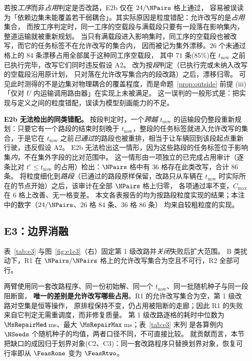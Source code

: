 \begin{remark}[实现缺陷被误读为边集缺陷的一例]
\label{rem:e2b_history}
若按\emph{工序}而非\emph{占用}判定是否改路，E2b 仅在 \(24/\NPairs\) 格上通过，
容易被误读为「依赖边集未能覆盖若干弱耦合」。其实际原因是粒度错配：允许改写的是\emph{占用}集合，
而按工序判定时，同一工序的空载段与满载段只要有一段落在影响集内，整道运输就被重新规划。
当只有满载段进入影响集时，同工序的空载段也被改写，而它的任务标签不在允许改写的集合内，
因而被记为集外漂移。\(26\) 个未通过格上的 \(84\) 条漂移占用全部属于这种同工序空载段，
其中 \(71\) 条(\(85\%\))在 \(t_{\mathrm{now}}\) 之前已执行完毕，改写它们同时违反假设 A2。
改为按\emph{段}判定（已执行完或未纳入改写的空载段沿用原计划，
只对落在允许改写集合内的段改路）之后，漂移归零。
可见此时测得的不是边集对物理耦合的覆盖程度，而是命题~\ref{prop:outside} 前提 (iii)
「仅对 \(U\) 内运输调用路由器」在实现上未被满足。
这一误判的一般形式是：把实现与定义之间的粒度错配，误读为模型刻画能力的不足。

\textbf{E2b 无法检出的同类错配。} 按段判定时，一个\emph{跨越}
\(t_{\mathrm{now}}\) 的运输段仍整段重新规划：只要它有一个路段的结束时刻晚于
\(t_{\mathrm{now}}\)，整段的任务标签就进入允许改写的集合，于是它在 \(t_{\mathrm{now}}\)
之前\emph{已通过}的路段也被重排，相当于让车辆回到该段起点重新行驶，违反假设 A2。
E2b 无法检出这一情形，因为这些路段的任务标签位于影响集\emph{内}，不在集外字段的比对范围中。
这一情形由一项独立的已完成占用审计（逐条比对 \(t^e\le t_{\mathrm{now}}\)
的占用）检出：\(\NPairs\) 格中有 \(36\) 格存在此类改写，合计 \(86\) 条。
将粒度细化到\emph{路段}（已通过的路段原样保留，改路只从车辆在
\(t_{\mathrm{now}}\) 时实际所在的节点开始）之后，该审计在全部 \(\NPairs\) 格上归零，
各项通过率不变，\(C_{\max}\) 在 \(6\) 格上改善、无一格变差。
本文各表报告的均为按路段粒度实现的结果；本注中的数字（\(24/\NPairs\)、\(26\) 格 \(84\) 条、\(36\) 格 \(86\) 条）
均来自较粗粒度的实现。
\end{remark}

\subsection{E3：边界消融}
\label{sec:e3}

表~\ref{tab:e3} 与图~\ref{fig:e1e3}（右）固定第 1 级改路并\emph{关闭}失败后扩大范围。
B 类扰动下，R1 在 \(\NPairs/\NPairs\) 格上的允许改写集合为空且不可行，R2 全部可行。

两臂使用同一套改路程序、同一份初始解、同一个 \(t_{\mathrm{now}}\)、同一批随机种子与同一段阻断窗，
\textbf{唯一的差别是允许改写哪些占用}。R1 的允许改写集合为空，第 1 级改路对空集是恒等操作，
原排程保持不变，仍占用被阻断的走廊；因此 R1 的失败来自它判定无需重调度，而非修复质量。
第 1 级改路逐格的耗时中位数为 \(\MsRepairMed\)\,ms、最大 \(\MsRepairMax\)\,ms；表~\ref{tab:e3} 末列
是各算例内 \(\NSeeds\) 个随机种子的均值，两者口径不同，不可直接比较。
就贡献而言，本节把缺口的成因归于划界对象(C2、C3)：同一套改路程序只替换划界对象，恢复可行率即从
\(\FeasRone\) 变为 \(\FeasRtwo\)。

